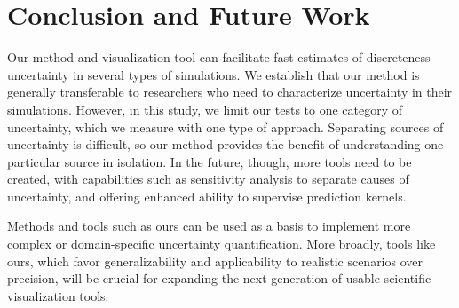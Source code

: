 

\section{Conclusion and Future Work}
Our method and visualization tool can facilitate fast estimates of discreteness uncertainty in several types of simulations. We establish that our method is generally transferable to researchers who need to characterize uncertainty in their simulations. However, in this study, we limit our tests to one category of uncertainty, which we measure with one type of approach. Separating sources of uncertainty is difficult, so our method provides the benefit of understanding one particular source in isolation. In the future, though, more tools need to be created, with capabilities such as sensitivity analysis to separate causes of uncertainty, and offering enhanced ability to supervise prediction kernels.

Methods and tools such as ours can be used as a basis to implement more complex or domain-specific uncertainty quantification. More broadly, tools like ours, which favor generalizability and applicability to realistic scenarios over precision, will be crucial for expanding the next generation of usable scientific visualization tools.